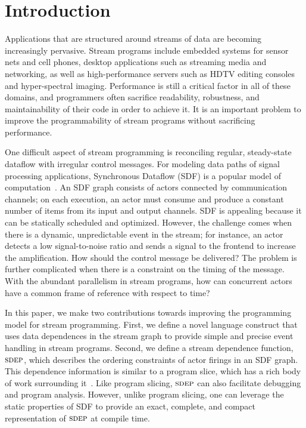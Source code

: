 \section{Introduction}

Applications that are structured around streams of data are becoming
increasingly pervasive.  Stream programs include embedded systems for
sensor nets and cell phones, desktop applications such as streaming
media and networking, as well as high-performance servers such as HDTV
editing consoles and hyper-spectral imaging.  Performance is still a
critical factor in all of these domains, and programmers often
sacrifice readability, robustness, and maintainability of their code
in order to achieve it.  It is an important problem to improve the
programmability of stream programs without sacrificing performance.

One difficult aspect of stream programming is reconciling regular,
steady-state dataflow with irregular control messages.  For modeling
data paths of signal processing applications, Synchronous Dataflow
(SDF) is a popular model of computation~\cite{LM87-i}.  An SDF graph
consists of actors connected by communication channels; on each
execution, an actor must consume and produce a constant number of
items from its input and output channels.  SDF is appealing because it
can be statically scheduled and optimized.  However, the challenge
comes when there is a dynamic, unpredictable event in the stream; for
instance, an actor detects a low signal-to-noise ratio and sends a
signal to the frontend to increase the amplification.  How should the
control message be delivered?  The problem is further complicated when
there is a constraint on the timing of the message.  With the abundant
parallelism in stream programs, how can concurrent actors have a
common frame of reference with respect to time?

In this paper, we make two contributions towards improving the
programming model for stream programming.  First, we define a novel
language construct that uses data dependences in the stream graph to
provide simple and precise event handling in stream programs.  Second,
we define a stream dependence function, $\textsc{sdep}$, which describes the
ordering constraints of actor firings in an SDF graph.  This
dependence information is similar to a program slice, which has a rich
body of work surrounding it~\cite{hrb88pdg,pugh97slice,tip95slice}.
Like program slicing, $\textsc{sdep}$ can also facilitate debugging and
program analysis.  However, unlike program slicing, one can leverage
the static properties of SDF to provide an exact, complete, and
compact representation of $\textsc{sdep}$ at compile time.  

